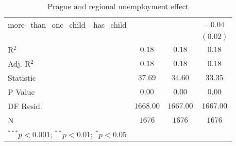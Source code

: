 \begin{table}
\begin{center}
\begin{tabular}{l c c c}
more\_than\_one\_child - has\_child     &               &               & $-0.04$       \\
                                        &               &               & $(0.02)$      \\
\hline
R$^2$                                   & $0.18$        & $0.18$        & $0.18$        \\
Adj. R$^2$                              & $0.18$        & $0.18$        & $0.18$        \\
Statistic                               & $37.69$       & $34.60$       & $33.35$       \\
P Value                                 & $0.00$        & $0.00$        & $0.00$        \\
DF Resid.                               & $1668.00$     & $1667.00$     & $1667.00$     \\
N                                       & $1676$        & $1676$        & $1676$        \\
\hline
\multicolumn{4}{l}{\scriptsize{$^{***}p<0.001$; $^{**}p<0.01$; $^{*}p<0.05$}}
\end{tabular}
\caption{Prague and regional unemployment effect}
\label{table:coefficients}
\end{center}
\end{table}
